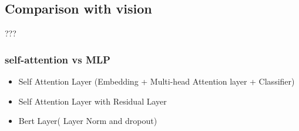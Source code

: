 \subsection{Comparison with vision}

???


\subsubsection{self-attention vs MLP}
\begin{itemize}
    \item Self Attention Layer (Embedding + Multi-head Attention layer + Classifier)
    \item Self Attention Layer  with Residual Layer
    \item Bert Layer( Layer Norm and dropout)
\end{itemize}




